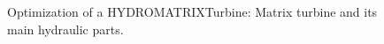 \begin{figure}[h!]
\begin{minipage}[b]{0.5\linewidth}
 \centering
\end{minipage}
\begin{minipage}[b]{0.5\linewidth}
 \centering
\end{minipage}
\caption{Optimization of a HYDROMATRIX\circledR Turbine: Matrix turbine and its main hydraulic parts. }
\label{Matrix_c}
\end{figure}

